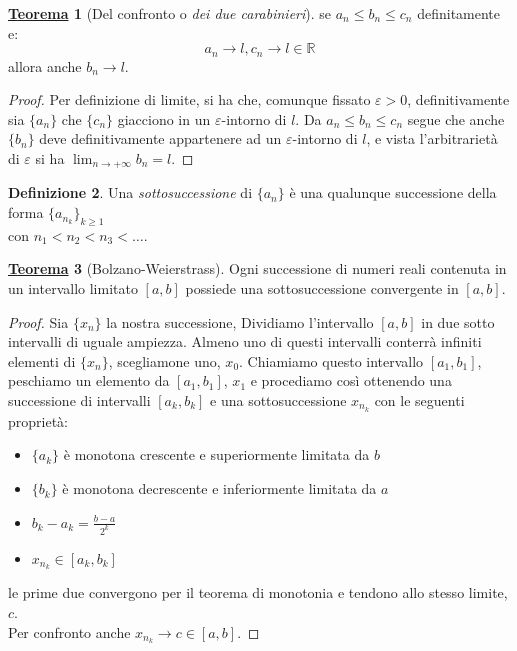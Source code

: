 \documentclass[a4paper,twoside]{article}
\renewcommand{\epsilon}{\varepsilon}
\newcommand{\R}{\mathbb{R}}
\theoremstyle{definition}
\newtheorem{theorem}{\color{Red}\underline{\textrm Teorema}}
\newtheorem{definizione}[theorem]{Definizione}
\numberwithin{theorem}{section}
\begin{document}
\begin{theorem}[Del confronto o \emph{dei due carabinieri}]
se $a_n\leq b_n \leq c_n$ definitamente e: 
$$a_n\to l, c_n \to l \in \R$$
allora anche $b_n\to l$.
\end{theorem}
\begin{proof}
Per definizione di limite, si ha che, comunque fissato $\epsilon >0$, definitivamente sia $\{a_n\}$ che $\{c_n\}$ giacciono in un $\epsilon$-intorno di $l$. Da $a_n\leq b_n\leq c_n$ segue che anche $\{b_n\}$ deve  definitivamente appartenere ad un $\epsilon$-intorno di $l$, e vista l'arbitrarietà di $\epsilon$ si ha $\lim_{n\to +\infty} b_n = l$. 
\end{proof}

\begin{definizione} Una \emph{sottosuccessione} di $\{a_n\}$ è una qualunque successione della forma $\{a_{n_k}\}_{k\geq 1}$\\ con $n_1 < n_2 < n_3 < \ldots$. 
\end{definizione}

\begin{theorem}[Bolzano-Weierstrass]
Ogni successione di numeri reali contenuta in un intervallo limitato $[a,b]$ possiede una sottosuccessione convergente in $[a,b]$.\end{theorem}
\begin{proof}
Sia $\{x_n\}$ la nostra successione, Dividiamo l'intervallo $[a,b]$ in due sotto intervalli di uguale ampiezza. Almeno uno di questi intervalli conterrà infiniti elementi di $\{x_n\}$, scegliamone uno, $x_0$. Chiamiamo questo intervallo $[a_1,b_1]$, peschiamo un elemento da $[a_1,b_1]$, $x_1$ e procediamo così ottenendo una successione di intervalli $[a_k,b_k]$ e una sottosuccessione $x_{n_k}$ con le seguenti proprietà:
\begin{itemize}
\item $\{a_k\}$ è monotona crescente e superiormente limitata da $b$
\item $\{b_k\}$ è monotona decrescente e inferiormente limitata da $a$
\item $b_k-a_k=\frac{b-a}{2^k}$
\item $x_{n_k}\in [a_k,b_k]$
\end{itemize}
le prime due convergono per il teorema di monotonia e tendono allo stesso limite, $c$.\\ Per confronto anche $x_{n_k}\to c\in [a,b]$.
\end{proof}
\end{document}
